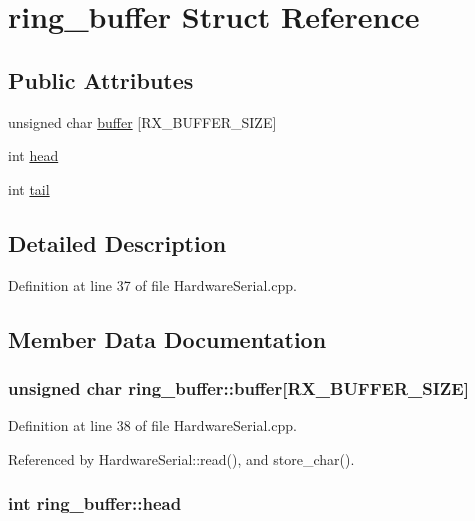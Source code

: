 \hypertarget{structring__buffer}{
\section{ring\_\-buffer Struct Reference}
\label{structring__buffer}
}
\subsection*{Public Attributes}
\begin{DoxyCompactItemize}
\item 
unsigned char \hyperlink{structring__buffer_a11b70d4a150ea9750e4102706d6ee0b8}{buffer} \mbox{[}RX\_\-BUFFER\_\-SIZE\mbox{]}
\item 
int \hyperlink{structring__buffer_ac1b620f2e27c3af75e68bd1645a2f5f0}{head}
\item 
int \hyperlink{structring__buffer_a4d06965736f37f64f15bbd0ca9457771}{tail}
\end{DoxyCompactItemize}


\subsection{Detailed Description}


Definition at line 37 of file HardwareSerial.cpp.



\subsection{Member Data Documentation}
\hypertarget{structring__buffer_a11b70d4a150ea9750e4102706d6ee0b8}{
\subsubsection[{buffer}]{\setlength{\rightskip}{0pt plus 5cm}unsigned char {\bf ring\_\-buffer::buffer}\mbox{[}RX\_\-BUFFER\_\-SIZE\mbox{]}}}
\label{structring__buffer_a11b70d4a150ea9750e4102706d6ee0b8}


Definition at line 38 of file HardwareSerial.cpp.



Referenced by HardwareSerial::read(), and store\_\-char().

\hypertarget{structring__buffer_ac1b620f2e27c3af75e68bd1645a2f5f0}{
\subsubsection[{head}]{\setlength{\rightskip}{0pt plus 5cm}int {\bf ring\_\-buffer::head}}}
\label{structring__buffer_ac1b620f2e27c3af75e68bd1645a2f5f0}


